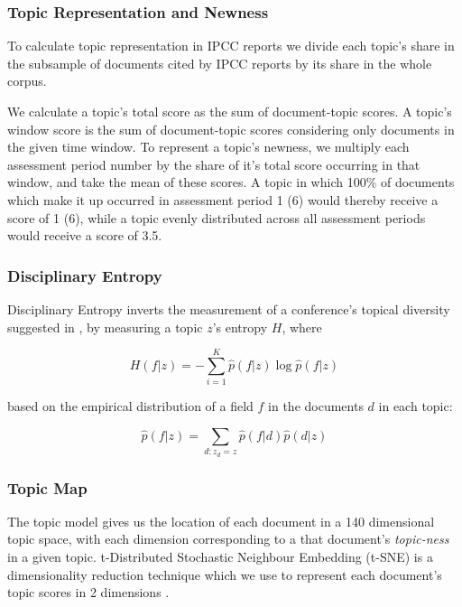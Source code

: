 \documentclass{article}
\begin{document}
\begin{linenumbers}
			
	\subsubsection*{Topic Representation and Newness}
	
	To calculate topic representation in IPCC reports we divide each topic's share in the subsample of documents cited by IPCC reports by its share in the whole corpus. 
	
	We calculate a topic's total score as the sum of document-topic scores. A topic's window score is the sum of document-topic scores considering only documents in the given time window. To represent a topic's newness, we multiply each assessment period number by the share of it's total score occurring in that window, and take the mean of these scores. A topic in which 100\% of documents which make it up occurred in assessment period 1 (6) would thereby receive a score of 1 (6), while a topic evenly distributed across all assessment periods would receive a score of 3.5.
	
	
	\subsubsection*{Disciplinary Entropy}
	
	Disciplinary Entropy inverts the measurement of a conference's topical diversity suggested in \cite{Hall2008}, by measuring a topic \(z\)'s entropy \(H\), where 
	
	\begin{equation}
		H(f|z) = -\sum_{i=1}^K \hat{p}(f|z) \log \hat{p}(f|z) 
	\end{equation}
	
	based on the empirical distribution of a field \(f\) in the documents \(d\) in each topic:
	
	\begin{equation}
		\hat{p}(f|z) = \sum_{d:z_d=z} \hat{p} (f|d) \hat{p} (d|z)
	\end{equation}
	
	\subsubsection*{Topic Map}
	The topic model gives us the location of each document in a 140 dimensional topic space, with each dimension corresponding to a that document's \textit{topic-ness} in a given topic. t-Distributed Stochastic Neighbour Embedding (t-SNE) is a dimensionality reduction technique which we use to represent each document's topic scores in 2 dimensions \cite{vandermaaten2008}.


\end{linenumbers}
\end{document}
